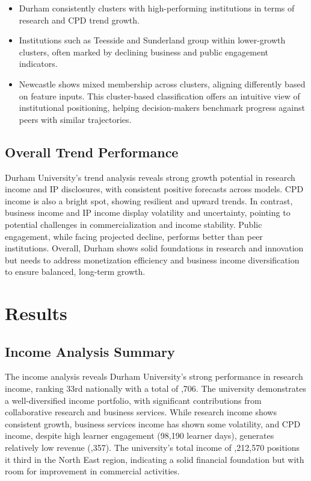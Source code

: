 \documentclass[journal,onecolumn, 10pt,draftclsnofoot]{IEEEtran}
\begin{document}
\begin{itemize}
    \item Durham consistently clusters with high-performing institutions in terms of research and CPD trend growth.
    \item Institutions such as Teesside and Sunderland group within lower-growth clusters, often marked by declining business and public engagement indicators.
    \item Newcastle shows mixed membership across clusters, aligning differently based on feature inputs. This cluster-based classification offers an intuitive view of institutional positioning, helping decision-makers benchmark progress against peers with similar trajectories.
\end{itemize}

\subsection{Overall Trend Performance}

Durham University's trend analysis reveals strong growth potential in research income and IP disclosures, with consistent positive forecasts across models. CPD income is also a bright spot, showing resilient and upward trends. In contrast, business income and IP income display volatility and uncertainty, pointing to potential challenges in commercialization and income stability. Public engagement, while facing projected decline, performs better than peer institutions. Overall, Durham shows solid foundations in research and innovation but needs to address monetization efficiency and business income diversification to ensure balanced, long-term growth.

\section{Results}

\subsection{Income Analysis Summary}

The income analysis reveals Durham University's strong performance in research income, ranking 33rd nationally with a total of ,706. The university demonstrates a well-diversified income portfolio, with significant contributions from collaborative research and business services. While research income shows consistent growth, business services income has shown some volatility, and CPD income, despite high learner engagement (98,190 learner days), generates relatively low revenue (,357). The university's total income of ,212,570 positions it third in the North East region, indicating a solid financial foundation but with room for improvement in commercial activities.
\end{document}

